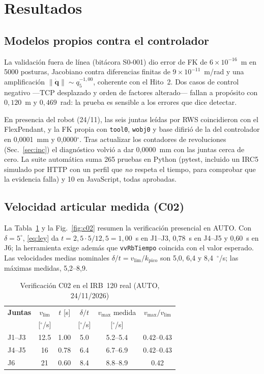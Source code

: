 \documentclass[conference]{IEEEtran}
\begin{document}
\section{Resultados}
\label{sec:res}

\subsection{Modelos propios contra el controlador}

La validación fuera de línea (bitácora S0-001) dio error de FK de
$6\times10^{-16}$~m en 5000 posturas, Jacobiano contra diferencias
finitas de $9\times10^{-11}$~m/rad y una amplificación
$\lVert\dot{\bm q}\rVert\sim q_5^{-1{,}00}$, coherente con el Hito~2.
Dos casos de control negativo ---TCP desplazado y orden de factores
alterado--- fallan a propósito con $0{,}120$~m y $0{,}469$~rad: la
prueba es sensible a los errores que dice detectar.

En presencia del robot (24/11), las seis juntas leídas por RWS
coincidieron con el FlexPendant, y la FK propia con \texttt{tool0},
\texttt{wobj0} y base difirió de la del controlador en 0{,}0001~mm y
0{,}0000$^\circ$. Tras actualizar los contadores de revoluciones
(Sec.~\ref{sec:inc}) el diagnóstico volvió a dar 0{,}0000~mm con las
juntas cerca de cero. La suite automática suma 265 pruebas en Python
(pytest, incluido un IRC5 simulado por HTTP con un perfil que
\emph{no} respeta el tiempo, para comprobar que la evidencia falla) y 10
en JavaScript, todas aprobadas.

\subsection{Velocidad articular medida (C02)}
\label{sec:res-c02}

La Tabla~\ref{tab:c02} y la Fig.~\ref{fig:c02} resumen la verificación
presencial en AUTO. Con $\delta=5^\circ$, \eqref{eq:ley} da
$t=2{,}5\cdot5/12{,}5=1{,}00$~s en J1--J3, 0{,}78~s en J4--J5 y 0{,}60~s
en J6; la herramienta exige además que \texttt{vvRbTiempo} coincida con
el valor esperado. Las
velocidades medias nominales $\delta/t=v_{\lim}/k_{\text{pico}}$ son
5{,}0, 6{,}4 y 8{,}4~$^\circ$/s; las máximas medidas, 5{,}2--8{,}9.

\begin{table}[htbp]
\caption{Verificación C02 en el IRB~120 real (AUTO, 24/11/2026)}
\label{tab:c02}
\centering
\footnotesize
\begin{tabular}{@{}lccccc@{}}
\toprule
\textbf{Juntas} & $v_{\lim}$ & $t$ [s] & $\delta/t$ & $v_{\max}$ medida & $v_{\max}/v_{\lim}$ \\
 & [$^\circ$/s] & & [$^\circ$/s] & [$^\circ$/s] & \\
\midrule
J1--J3 & 12.5 & 1.00 & 5.0 & 5.2--5.4 & 0.42--0.43 \\
J4--J5 & 16   & 0.78 & 6.4 & 6.7--6.9 & 0.42--0.43 \\
J6     & 21   & 0.60 & 8.4 & 8.8--8.9 & 0.42 \\
\bottomrule
\end{tabular}
\end{table}
\end{document}
